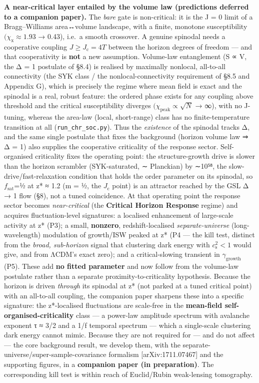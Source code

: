 \documentclass[
  10pt,
]{article}
\begin{document}
\textbf{A near-critical layer entailed by the volume law (predictions
deferred to a companion paper).} The \emph{bare} gate is non-critical:
it is the J = 0 limit of a Bragg--Williams area↔volume landscape, with a
finite, monotone susceptibility \((\chi _{\mathrm{x}} \approx  1.93\) →
0.43), i.e.~a smooth crossover. A genuine spinodal needs a cooperative
coupling \(J \geq  J_{\mathrm{c}} = 4T\) between the horizon degrees of
freedom --- and that cooperativity is \textbf{not} a new assumption.
Volume-law entanglement (S ∝ V, the Δ = 1 postulate of §8.4) is realised
by maximally nonlocal, all-to-all connectivity (the SYK class / the
nonlocal-connectivity requirement of §8.5 and Appendix G), which is
precisely the regime where mean field is exact and the spinodal is a
real, robust feature: the ordered phase exists for any coupling above
threshold and the critical susceptibility diverges
\((\chi _{\mathrm{peak}} \propto  \surd N\) → ∞), with no J-tuning,
whereas the area-law (local, short-range) class has no
finite-temperature transition at all (\texttt{run\_chr\_soc.py}). Thus
the \emph{existence} of the spinodal tracks Δ, and the same single
postulate that fixes the background (horizon volume law ⇒ Δ = 1) also
supplies the cooperative criticality of the response sector.
Self-organised criticality fixes the operating point: the
structure-growth drive is slower than the horizon scrambler
(SYK-saturated, ∼ Planckian) by ∼10⁵⁸, the slow-drive/fast-relaxation
condition that holds the order parameter on its spinodal, so
\(f_{\mathrm{sat}}\)=½ at z* ≈ 1.2 (m = ½, the \(J_{\mathrm{c}}\) point)
is an attractor reached by the GSL Δ → 1 flow (§8), not a tuned
coincidence. At that operating point the response sector becomes
\emph{near-critical} (the \textbf{Critical Horizon Response} regime) and
acquires fluctuation-level signatures: a localised enhancement of
large-scale activity at z* (P3); a small, \textbf{nonzero},
redshift-localised \emph{separate-universe} (long-wavelength) modulation
of growth/ISW peaked at z* (P4 --- the kill test, distinct from the
\emph{broad, sub-horizon} signal that clustering dark energy with
\(c_{\mathrm{s}}^{2} < 1\) would give, and from ΛCDM's exact zero); and
a critical-slowing transient in \(\gamma _{\mathrm{growth}}\) (P5).
These add \textbf{no fitted parameter} and now follow from the
volume-law postulate rather than a separate proximity-to-criticality
hypothesis. Because the horizon is driven \emph{through} its spinodal at
z* (not parked at a tuned critical point) with an all-to-all coupling,
the companion paper sharpens these into a specific signature: the
z*-localised fluctuations are scale-free in the \textbf{mean-field
self-organised-criticality} class --- a power-law amplitude spectrum
with avalanche exponent τ ≈ 3/2 and a 1/f temporal spectrum --- which a
single-scale clustering dark energy cannot mimic. Because they are not
required for --- and do not affect --- the core background result, we
develop them, with the separate-universe/super-sample-covariance
formalism {[}arXiv:1711.07467{]} and the supporting figures, in a
\textbf{companion paper (in preparation)}. The corresponding kill test
is within reach of Euclid/Rubin weak-lensing tomography.
\end{document}
